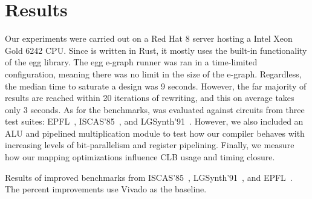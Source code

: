 \section{Results}\label{sec:results}
Our experiments were carried out on a Red Hat 8 server hosting a Intel Xeon
Gold 6242 CPU. Since \shortname{} is written in Rust, it mostly uses the
built-in functionality of the egg library. The egg e-graph runner was ran in a
time-limited configuration, meaning there was no limit in the size of the
e-graph. Regardless, the median time to saturate a design was 9 seconds.
However, the far majority of results are reached within 20 iterations of
rewriting, and this on average takes only 3 seconds. As for the benchmarks,
\shortname{} was evaluated against circuits from three test suites:
EPFL~\cite{epflbench}, ISCAS'85~\cite{iscasbench}, and
LGSynth'91~\cite{lgsynthbench}. However, we also included an ALU and pipelined
multiplication module to test how our compiler behaves with increasing levels
of bit-parallelism and register pipelining. Finally, we measure how our mapping
optimizations influence CLB usage and timing closure.

\begin{table}
    \centering
    \caption{Results of \nimproved{} improved benchmarks from ISCAS'85~\cite{iscasbench}, LGSynth'91~\cite{lgsynthbench}, and EPFL~\cite{epflbench}. The percent improvements use Vivado as the baseline.}\label{tab:results}
\end{table}

